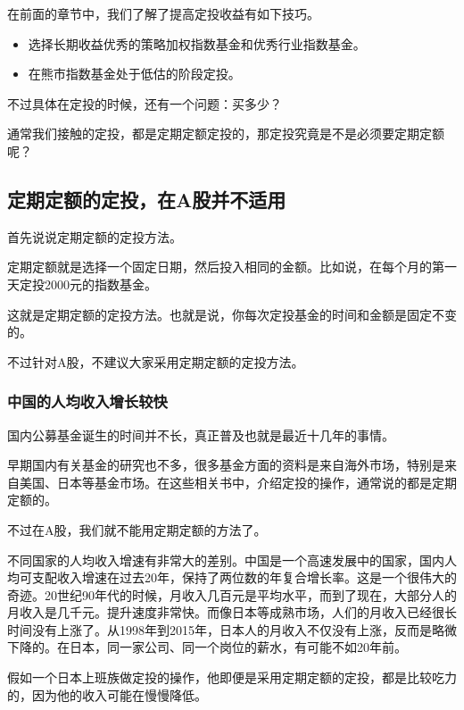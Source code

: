 

\setcounter{figure}{0}\setcounter{table}{0}
在前面的章节中，我们了解了提高定投收益有如下技巧。

\begin{itemize}
\item 选择长期收益优秀的策略加权指数基金和优秀行业指数基金。
\item 在熊市指数基金处于低估的阶段定投。
\end{itemize}

不过具体在定投的时候，还有一个问题：买多少？

通常我们接触的定投，都是定期定额定投的，那定投究竟是不是必须要定期定额呢？

\subsection{定期定额的定投，在A股并不适用}
首先说说定期定额的定投方法。

定期定额就是选择一个固定日期，然后投入相同的金额。比如说，在每个月的第一天定投2000元的指数基金。

这就是定期定额的定投方法。也就是说，你每次定投基金的时间和金额是固定不变的。

不过针对A股，不建议大家采用定期定额的定投方法。

\subsubsection{中国的人均收入增长较快}

国内公募基金诞生的时间并不长，真正普及也就是最近十几年的事情。

早期国内有关基金的研究也不多，很多基金方面的资料是来自海外市场，特别是来自美国、日本等基金市场。在这些相关书中，介绍定投的操作，通常说的都是定期定额的。

不过在A股，我们就不能用定期定额的方法了。

不同国家的人均收入增速有非常大的差别。中国是一个高速发展中的国家，国内人均可支配收入增速在过去20年，保持了两位数的年复合增长率。这是一个很伟大的奇迹。20世纪90年代的时候，月收入几百元是平均水平，而到了现在，大部分人的月收入是几千元。提升速度非常快。而像日本等成熟市场，人们的月收入已经很长时间没有上涨了。从1998年到2015年，日本人的月收入不仅没有上涨，反而是略微下降的。在日本，同一家公司、同一个岗位的薪水，有可能不如20年前。

假如一个日本上班族做定投的操作，他即便是采用定期定额的定投，都是比较吃力的，因为他的收入可能在慢慢降低。

